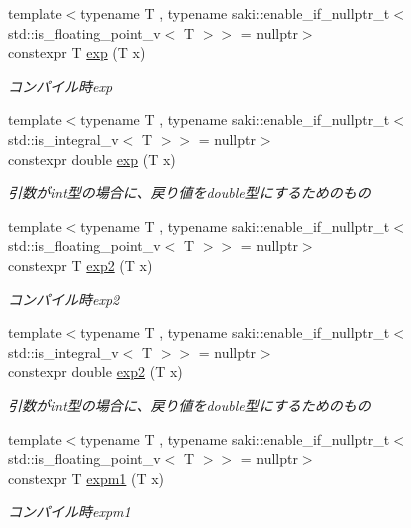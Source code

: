 \begin{DoxyCompactItemize}
{\footnotesize template$<$typename T , typename saki\+::enable\+\_\+if\+\_\+nullptr\+\_\+t$<$ std\+::is\+\_\+floating\+\_\+point\+\_\+v$<$ T $>$$>$  = nullptr$>$ }\\constexpr T \mbox{\hyperlink{namespacesaki_abc1268e543a60d43b04f1418f5ef3e41}{exp}} (T x)
\begin{DoxyCompactList}\small\item\em コンパイル時exp \end{DoxyCompactList}\item 
{\footnotesize template$<$typename T , typename saki\+::enable\+\_\+if\+\_\+nullptr\+\_\+t$<$ std\+::is\+\_\+integral\+\_\+v$<$ T $>$$>$  = nullptr$>$ }\\constexpr double \mbox{\hyperlink{namespacesaki_ab7883c6dfd2cf3ae04993f64d98345fc}{exp}} (T x)
\begin{DoxyCompactList}\small\item\em 引数がint型の場合に、戻り値をdouble型にするためのもの \end{DoxyCompactList}\item 
{\footnotesize template$<$typename T , typename saki\+::enable\+\_\+if\+\_\+nullptr\+\_\+t$<$ std\+::is\+\_\+floating\+\_\+point\+\_\+v$<$ T $>$$>$  = nullptr$>$ }\\constexpr T \mbox{\hyperlink{namespacesaki_a2e2d4ba08357bbab05c97ae261c80343}{exp2}} (T x)
\begin{DoxyCompactList}\small\item\em コンパイル時exp2 \end{DoxyCompactList}\item 
{\footnotesize template$<$typename T , typename saki\+::enable\+\_\+if\+\_\+nullptr\+\_\+t$<$ std\+::is\+\_\+integral\+\_\+v$<$ T $>$$>$  = nullptr$>$ }\\constexpr double \mbox{\hyperlink{namespacesaki_a35e9ce74a5f65c8d38a4901bf513ac1e}{exp2}} (T x)
\begin{DoxyCompactList}\small\item\em 引数がint型の場合に、戻り値をdouble型にするためのもの \end{DoxyCompactList}\item 
{\footnotesize template$<$typename T , typename saki\+::enable\+\_\+if\+\_\+nullptr\+\_\+t$<$ std\+::is\+\_\+floating\+\_\+point\+\_\+v$<$ T $>$$>$  = nullptr$>$ }\\constexpr T \mbox{\hyperlink{namespacesaki_aabb63a6251c75f6f1e76a58f5438de69}{expm1}} (T x)
\begin{DoxyCompactList}\small\item\em コンパイル時expm1 \end{DoxyCompactList}\item 

\end{DoxyCompactItemize}
